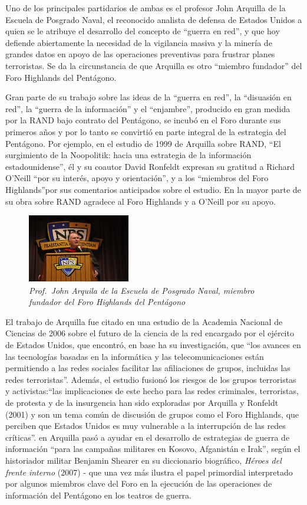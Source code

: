 \documentclass[10pt,a5paper,twoside,spanish,]{book}
\begin{document}
Uno de los principales partidarios de ambas es el profesor John Arquilla
de la Escuela de Posgrado Naval, el reconocido analista de defensa de
Estados Unidos a quien se le atribuye el desarrollo del concepto de
``guerra en red'', y que hoy defiende abiertamente la necesidad de la
vigilancia masiva y la minería de grandes datos en apoyo de las
operaciones preventivas para frustrar planes terroristas. Se da la
circunstancia de que Arquilla es otro ``miembro fundador'' del Foro
Highlands del Pentágono.

Gran parte de su trabajo sobre las ideas de la ``guerra en red'', la
``disuasión en red'', la ``guerra de la información'' y el ``enjambre'',
producido en gran medida por la RAND bajo contrato del Pentágono, se
incubó en el Foro durante sus primeros años y por lo tanto se convirtió
en parte integral de la estrategia del Pentágono. Por ejemplo, en el
estudio de 1999 de Arquilla sobre RAND, ``El surgimiento de la
Noopolitik: hacia una estrategia de la información estadounidense'', él
y su coautor David Ronfeldt expresan su gratitud a Richard O'Neill ``por
su interés, apoyo y orientación'', y a los ``miembros del Foro
Highlands''por sus comentarios anticipados sobre el estudio. En la mayor
parte de su obra sobre RAND agradece al Foro Highlands y a O'Neill por
su apoyo.

\begin{figure}[htbp]
\centering
\includegraphics{2.4.png}
\caption{\emph{Prof.~John Arquila de la Escuela de Posgrado Naval,
miembro fundador del Foro Highlands del Pentágono}}
\end{figure}

El trabajo de Arquilla fue citado en una estudio de la Academia Nacional
de Ciencias de 2006 sobre el futuro de la ciencia de la red encargado
por el ejército de Estados Unidos, que encontró, en base ha su
investigación, que ``los avances en las tecnologías basadas en la
informática y las telecomunicaciones están permitiendo a las redes
sociales facilitar las afiliaciones de grupos, incluidas las redes
terroristas''. Además, el estudio fusionó los riesgos de los grupos
terroristas y activistas:``las implicaciones de este hecho para las
redes criminales, terroristas, de protesta y de la insurgencia han sido
exploradas por Arquilla y Ronfeldt (2001) y son un tema común de
discusión de grupos como el Foro Highlands, que perciben que Estados
Unidos es muy vulnerable a la interrupción de las redes críticas''. en
Arquilla pasó a ayudar en el desarrollo de estrategias de guerra de
información ``para las campañas militares en Kosovo, Afganistán e
Irak'', según el historiador militar Benjamin Shearer en su diccionario
biográfico, \emph{Héroes del frente interno} (2007) - que una vez más
ilustra el papel primordial interpretado por algunos miembros clave del
Foro en la ejecución de las operaciones de información del Pentágono en
los teatros de guerra.
\end{document}
